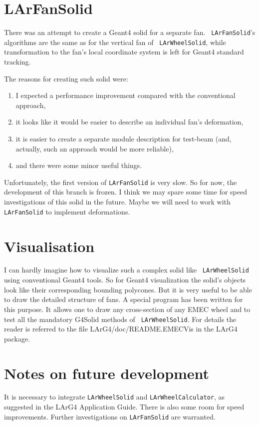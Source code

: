 \documentclass{article}
\begin{document}
\section{LArFanSolid}
There was an attempt to create a Geant4 solid for a separate fan. {\tt
LArFanSolid}'s algorithms are the same as for the vertical fan of {\tt
LArWheelSolid}, while transformation to the fan's local coordinate system is
left for Geant4 standard tracking.

The reasons for creating such solid were:
\begin{enumerate}
\item I expected a performance improvement compared with the conventional approach,
\item it looks like it would be easier to describe an individual fan's deformation,
\item it is easier to create a separate module description for test-beam (and,
actually, such an approach would be more reliable),
\item and there were some minor useful things.
\end{enumerate}

Unfortunately, the first version of {\tt LArFanSolid} is very slow. So
for now, the
development of this branch is frozen. I think we may spare some time for speed
investigations of this solid in the future. Maybe we will need to work with {\tt
LArFanSolid} to implement deformations.

\section{Visualisation}
I can hardly imagine how to visualize such a complex solid like {\tt
LArWheelSolid} using conventional Geant4 tools. So for Geant4 visualization the
solid's objects look like their corresponding bounding polycones. But it is very
useful to be able to draw the detailed structure of fans. A special
program has been written for this purpose. It allows one to draw any cross-section of any
EMEC wheel and to test all the mandatory G4Solid methods of {\tt
LArWheelSolid}. For  details the reader is referred to the file
LArG4/doc/README.EMECVis in the LArG4 package.

\section{Notes on future development}
It is necessary to integrate {\tt LArWheelSolid} and {\tt LArWheelCalculator},
as suggested in the LArG4 Application Guide. There is also some room for speed
improvements. Further investigations on {\tt LArFanSolid} are warranted.


\end{document}
